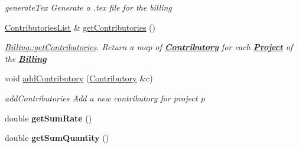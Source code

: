 \begin{DoxyCompactItemize}
\begin{DoxyCompactList}\small\item\em generate\-Tex Generate a .tex file for the billing \end{DoxyCompactList}\item 
\hyperlink{classModels_1_1ContributoriesList}{Contributories\-List} \& \hyperlink{classModels_1_1Billing_af3d66c06d8c4d855b0efa5ff599a3ceb}{get\-Contributories} ()
\begin{DoxyCompactList}\small\item\em \hyperlink{classModels_1_1Billing_af3d66c06d8c4d855b0efa5ff599a3ceb}{Billing\-::get\-Contributories}. Return a map of {\bfseries \hyperlink{classModels_1_1Contributory}{Contributory}} for each {\bfseries \hyperlink{classModels_1_1Project}{Project}} of the {\bfseries \hyperlink{classModels_1_1Billing}{Billing}} \end{DoxyCompactList}\item 
void \hyperlink{classModels_1_1Billing_a3636d785d2cb77d83d21a795e1f91a60}{add\-Contributory} (\hyperlink{classModels_1_1Contributory}{Contributory} \&c)
\begin{DoxyCompactList}\small\item\em add\-Contributories Add a new contributory for project p \end{DoxyCompactList}\item 
\hypertarget{classModels_1_1Billing_ab12d213423acfe0e0b7b1f6b43a92e28}{double {\bfseries get\-Sum\-Rate} ()}\label{classModels_1_1Billing_ab12d213423acfe0e0b7b1f6b43a92e28}

\item 
\hypertarget{classModels_1_1Billing_a360006189d4867e3281009b0c465bc53}{double {\bfseries get\-Sum\-Quantity} ()}\label{classModels_1_1Billing_a360006189d4867e3281009b0c465bc53}


\end{DoxyCompactItemize}
